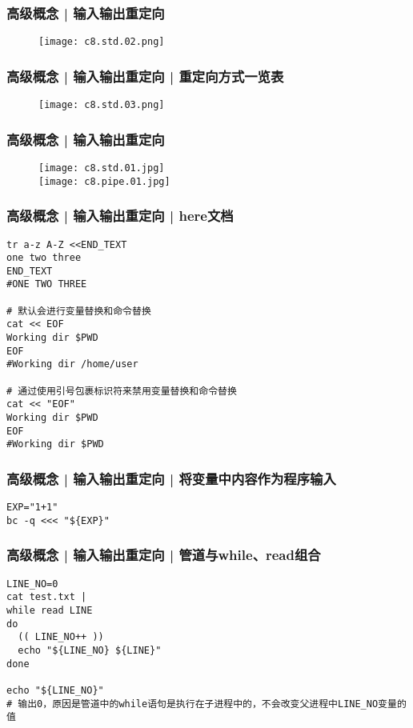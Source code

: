 \begin{frame}
  \frametitle{高级概念 | 输入输出重定向}
  \begin{figure}
    \centering
    \texttt{[image: c8.std.02.png]}
  \end{figure}
\end{frame}

\begin{frame}
  \frametitle{高级概念 | 输入输出重定向 | 重定向方式一览表}
  \begin{figure}
    \centering
    \texttt{[image: c8.std.03.png]}
  \end{figure}
\end{frame}

\begin{frame}
  \frametitle{高级概念 | 输入输出重定向}
  \begin{figure}
    \centering
    \texttt{[image: c8.std.01.jpg]}\\
    \texttt{[image: c8.pipe.01.jpg]}
  \end{figure}
\end{frame}

\begin{frame}[fragile]
  \frametitle{高级概念 | 输入输出重定向 | here文档}
\begin{lstlisting}
tr a-z A-Z <<END_TEXT
one two three
END_TEXT
#ONE TWO THREE

# 默认会进行变量替换和命令替换
cat << EOF
Working dir $PWD
EOF
#Working dir /home/user

# 通过使用引号包裹标识符来禁用变量替换和命令替换
cat << "EOF"
Working dir $PWD
EOF
#Working dir $PWD
\end{lstlisting}
\end{frame}

\begin{frame}[fragile]
  \frametitle{高级概念 | 输入输出重定向 | 将变量中内容作为程序输入}
\begin{lstlisting}
EXP="1+1"
bc -q <<< "${EXP}"
\end{lstlisting}
\end{frame}

\begin{frame}[fragile]
  \frametitle{高级概念 | 输入输出重定向 | 管道与while、read组合}
\begin{lstlisting}
LINE_NO=0
cat test.txt | 
while read LINE
do
  (( LINE_NO++ ))
  echo "${LINE_NO} ${LINE}"
done

echo "${LINE_NO}"
# 输出0，原因是管道中的while语句是执行在子进程中的，不会改变父进程中LINE_NO变量的值
\end{lstlisting}
\end{frame}


